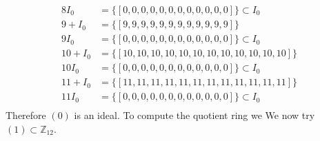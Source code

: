 \documentclass[11pt]{amsart}
\begin{document}
\begin{equation*}
\begin{aligned}
8 I_0 &= \{[0, 0, 0, 0, 0, 0, 0, 0, 0, 0, 0, 0]\} \subset I_0 \\
9+ I_0 &= \{[9, 9, 9, 9, 9, 9, 9, 9, 9, 9, 9, 9]\}\\
9 I_0 &= \{[0, 0, 0, 0, 0, 0, 0, 0, 0, 0, 0, 0]\} \subset I_0 \\
10+ I_0 &= \{[10, 10, 10, 10, 10, 10, 10, 10, 10, 10, 10, 10]\}\\
10 I_0 &= \{[0, 0, 0, 0, 0, 0, 0, 0, 0, 0, 0, 0]\} \subset I_0 \\
11+ I_0 &= \{[11, 11, 11, 11, 11, 11, 11, 11, 11, 11, 11, 11]\}\\
11 I_0 &= \{[0, 0, 0, 0, 0, 0, 0, 0, 0, 0, 0, 0]\} \subset I_0 \\
\end{aligned}
\end{equation*}
Therefore $(0)$ is an ideal.
To compute the quotient ring we
We now try $(1) \subset \mathbb{Z}_{12}$.
\end{document}
